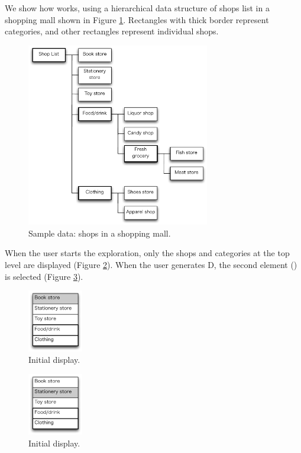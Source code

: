 \documentclass{article}
\begin{document}
We show how {\ST} works, using a hierarchical data structure of
shops list in a shopping mall shown in Figure \ref{fig1}.
Rectangles with thick border represent categories, and
other rectangles represent individual shops.

\begin{figure}[H]
\centerline{\includegraphics[width=80mm,bb=0 0 490 490]{figures/fig1.pdf}}
\caption{Sample data: shops in a shopping mall.}
\label{fig1}
\end{figure}

When the user starts the exploration, only the shops and categories
at the top level are displayed (Figure \ref{fig2}).
When the user generates D,
the second element () is selected (Figure \ref{fig3}).

\begin{figure}[H]
\centerline{\includegraphics[width=24mm,bb=0 0 139 157]{figures/fig2.pdf}}
\caption{Initial display.}
\label{fig2}
\end{figure}

\begin{figure}[H]
\centerline{\includegraphics[width=24mm,bb=0 0 139 157]{figures/fig3.pdf}}
\caption{Initial display.}
\label{fig3}
\end{figure}
\end{document}
